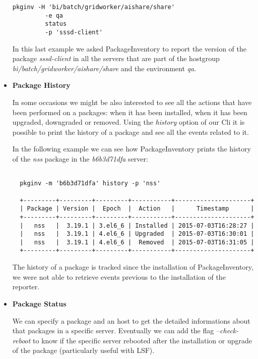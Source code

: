 \begin{itemize}
  \begin{lstlisting}[frame=single]
  pkginv -H 'bi/batch/gridworker/aishare/share'
         -e qa
         status
         -p 'sssd-client'
  \end{lstlisting}

  In this last example we asked PackageInventory to report the version of
  the package \textit{sssd-client} in all the servers that are part of the
  hostgroup \textit{bi/batch/gridworker/aishare/share} and the environment
  \textit{qa}.
  
  \item \textbf{Package History}

  In some occasions we might be also interested to see all the actions
  that have been performed on a packages: when it has been installed, when
  it has been upgraded, downgraded or removed. Using the \textit{history}
  option of our Cli it is possible to print the history of a package and
  see all the events related to it.

  In the following example we can see how PackageInventory prints the
  history of the \textit{nss} package in the \textit{b6b3d71dfa} server:
  \newline{}

  \begin{lstlisting}[frame=single,basicstyle=\footnotesize]
  
  pkginv -m 'b6b3d71dfa' history -p 'nss'
  
  +---------+---------+---------+-----------+---------------------+
  | Package | Version |  Epoch  |  Action   |      Timestamp      |
  +---------+---------+---------+-----------+---------------------+
  |   nss   |  3.19.1 | 3.el6_6 | Installed | 2015-07-03T16:28:27 |
  |   nss   |  3.19.1 | 4.el6_6 | Upgraded  | 2015-07-03T16:30:01 |
  |   nss   |  3.19.1 | 4.el6_6 |  Removed  | 2015-07-03T16:31:05 |
  +---------+---------+---------+-----------+---------------------+
  \end{lstlisting}

  The history of a package is tracked since the installation of
  PackageInventory, we were not able to retrieve events previous to the
  installation of the reporter.
 
  \item \textbf{Package Status}

  We can specify a package and an host to get the detailed informations
  about that packages in a specific server. Eventually we can add the flag
  \textit{--check-reboot} to know if the specific server rebooted after
  the installation or upgrade of the package (particularly useful with
  LSF).
 

\end{itemize}
